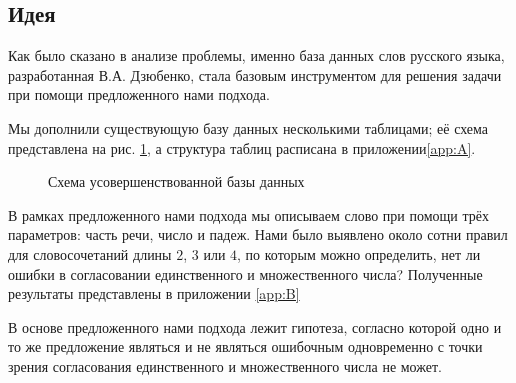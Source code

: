 \documentclass[main]{subfiles}
\begin{document}
\subsection{Идея}

Как было сказано в анализе проблемы, именно база данных слов русского языка, разработанная В.А. Дзюбенко, стала базовым инструментом для решения задачи при помощи предложенного нами подхода.

Мы дополнили существующую базу данных несколькими таблицами; её схема представлена на рис. \ref{img1}, а структура таблиц расписана в приложении\ref{app:A}.


\begin{figure}[h]
	\begin{minipage}[h]{\linewidth}
			\captionsetup{format=hang,labelsep = endash}
		\caption{Схема усовершенствованной базы данных}\label{img1}
	\end{minipage}
\end{figure}

В рамках предложенного нами подхода мы описываем слово при помощи трёх параметров: часть речи, число и падеж. Нами было выявлено около сотни правил для словосочетаний длины $2$, $3$ или $4$, по которым можно определить, нет ли ошибки в согласовании единственного и множественного числа? Полученные результаты представлены в приложении \ref{app:B}

В основе предложенного нами подхода лежит гипотеза, согласно которой одно и то же предложение являться и не являться ошибочным одновременно с точки зрения согласования единственного и множественного числа не может. 
\end{document}
